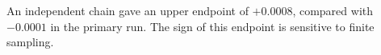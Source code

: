 An independent chain gave an upper endpoint of \(+0.0008\), compared with \(-0.0001\) in the primary run. The sign of this endpoint is sensitive to finite sampling.
